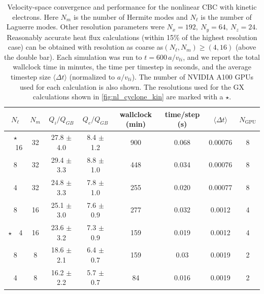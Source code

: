 \documentclass{jpp}
\begin{document}
\begin{table}
    \centering
    \begin{tabular}{c c c c c c c c}
    $ N_\ell$ & $ N_m$ & \qquad$Q_i/Q_{GB}$ \qquad\qquad & \quad$Q_e/Q_{GB}$ \qquad & wallclock (min) & time/step (s) & $\langle\Delta t\rangle$& $N_\mathrm{GPU}$\\%
\toprule
$\star$\ \ 16\quad\quad	    &32 &   27.8    $\pm$   4.0 &	8.4	$\pm$	1.2	&	900&	0.068	& 0.00076 &	8 \\%
\hline
8       &32	&   29.4    $\pm$   3.3	&	8.8	$\pm$	1.0	&	448	&	0.034		& 0.00076&   8 \\%
\hline
4       &32	&   24.8    $\pm$   3.3	&	7.8	$\pm$	1.0	&	255	&	0.020	& 0.00077&	8 \\%
\hline
8       &16	&   25.1    $\pm$   3.0	&	7.6	$\pm$	0.9	&	277	&	0.032	& 0.0012 &	4 \\%
\hline
$\star$\ \ 4\quad\quad	    &16	&   23.6    $\pm$   3.2	&	7.3	$\pm$	0.9	&	159	&	0.019 & 0.0012	&	4\\%
\hline
\hline
8       &8	&   18.6    $\pm$   2.1	&   6.4	$\pm$	0.7	&	159	&	0.03 & 0.0019	&	2 \\%
\hline
4       &8	&   16.2    $\pm$   2.2	&	5.7	$\pm$	0.7	&	84	&	0.016 & 0.0019	&	2\\%
\end{tabular}
    \caption{Velocity-space convergence and performance for the nonlinear CBC with kinetic electrons. Here $ N_m$ is the number of Hermite modes and $ N_\ell$ is the number of Laguerre modes. Other resolution parameters were $N_x=192,\ N_y=64,\ N_z=24$. Reasonably accurate heat flux calculations {\color{black} (within 15\% of the highest resolution case)} can be obtained with resolution as coarse as$( N_\ell, N_m)\geq(4,16)$ (above the double bar). Each simulation was run to $t = 600 \,a/v_{ti}$, and we report the total wallclock time in minutes, the time per timestep in seconds, and the average timestep size $\langle\Delta t\rangle$ (normalized to $a/v_{ti}$). The number of NVIDIA A100 GPUs used for each calculation is also shown. The resolutions used for the GX calculations shown in \cref{fig:nl_cyclone_kin} are marked with a $\star$.}
    \label{tab:nl_cyclone_kin}
\end{table}
\end{document}
